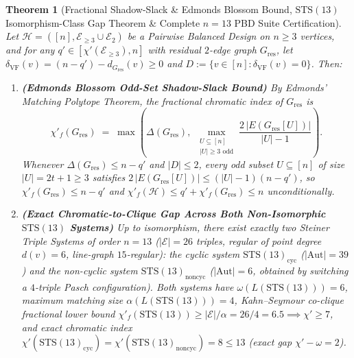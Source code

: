 \documentclass[11pt,reqno]{amsart}
\newtheorem{theorem}{Theorem}[section]
\theoremstyle{definition}
\theoremstyle{remark}
\begin{document}
\begin{theorem}[Fractional Shadow-Slack \& Edmonds Blossom Bound, $\mathrm{STS}(13)$ Isomorphism-Class Gap Theorem \& Complete $n = 13$ PBD Suite Certification]\label{thm:fractional_blossom_sts13}
Let $\mathcal{H} = ([n], \mathcal{E}_{\ge 3} \cup \mathcal{E}_2)$ be a Pairwise Balanced Design on $n \ge 3$ vertices, and for any $q' \in [\chi'(\mathcal{E}_{\ge 3}), n]$ with residual $2$-edge graph $G_{\mathrm{res}}$, let $\delta_{\mathrm{VF}}(v) = (n - q') - d_{G_{\mathrm{res}}}(v) \ge 0$ and $D := \{v \in [n] : \delta_{\mathrm{VF}}(v) = 0\}$. Then:
\begin{enumerate}
  \item[\textup{(a)}] \textbf{(Edmonds Blossom Odd-Set Shadow-Slack Bound)} By Edmonds' Matching Polytope Theorem, the fractional chromatic index of $G_{\mathrm{res}}$ is
  \begin{equation}\label{eq:edmonds_blossom}
    \chi'_f(G_{\mathrm{res}}) \;=\; \max\!\left(\Delta(G_{\mathrm{res}}),\; \max_{\substack{U \subseteq [n] \\ |U| \ge 3 \text{ odd}}} \frac{2\,|E(G_{\mathrm{res}}[U])|}{|U| - 1}\right).
  \end{equation}
  Whenever $\Delta(G_{\mathrm{res}}) \le n - q'$ and $|D| \le 2$, every odd subset $U \subseteq [n]$ of size $|U| = 2t + 1 \ge 3$ satisfies $2\,|E(G_{\mathrm{res}}[U])| \le (|U| - 1)(n - q')$, so $\chi'_f(G_{\mathrm{res}}) \le n - q'$ and $\chi'_f(\mathcal{H}) \le q' + \chi'_f(G_{\mathrm{res}}) \le n$ unconditionally.
  \item[\textup{(b)}] \textbf{(Exact Chromatic-to-Clique Gap Across Both Non-Isomorphic $\mathrm{STS}(13)$ Systems)} Up to isomorphism, there exist exactly two Steiner Triple Systems of order $n = 13$ ($|\mathcal{E}| = 26$ triples, regular of point degree $d(v) = 6$, line-graph $15$-regular): the cyclic system $\mathrm{STS}(13)_{\mathrm{cyc}}$ ($|\mathrm{Aut}| = 39$) and the non-cyclic system $\mathrm{STS}(13)_{\mathrm{noncyc}}$ ($|\mathrm{Aut}| = 6$, obtained by switching a $4$-triple Pasch configuration). Both systems have $\omega(L(\mathrm{STS}(13))) = 6$, maximum matching size $\alpha(L(\mathrm{STS}(13))) = 4$, Kahn--Seymour co-clique fractional lower bound $\chi'_f(\mathrm{STS}(13)) \ge |\mathcal{E}| / \alpha = 26 / 4 = 6.5 \implies \chi' \ge 7$, and exact chromatic index $\chi'(\mathrm{STS}(13)_{\mathrm{cyc}}) = \chi'(\mathrm{STS}(13)_{\mathrm{noncyc}}) = 8 \le 13$ (exact gap $\chi' - \omega = 2$).

\end{enumerate}
\end{theorem}
\end{document}
